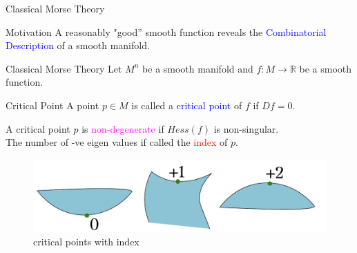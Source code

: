 \documentclass[10pt,sans-serif]{beamer}
\begin{document}
\begin{frame}{Classical Morse Theory}
  \begin{block}{Motivation}
    A reasonably "good'' smooth function reveals the
    \textcolor{blue}{Combinatorial Description} of a smooth manifold.
  \end{block}
\end{frame}


\begin{frame}{Classical Morse Theory}
  Let $M^n$ be a smooth manifold and $f:M\to\mathbb R$ be a smooth function. 
  
  \begin{block}{Critical Point}
    A point $p\in M$ is called a \textcolor{blue}{critical point} of $f$ if
    $Df=0$.
    
    \pause
    \vspace{10pt}
    
    A critical point $p$ is \textcolor{magenta}{non-degenerate} if $Hess(f)$ is
    non-singular. \\
    The number of -ve eigen values if called the \textcolor{red}{index} of $p$.
  \end{block}
  
  
  \pause
  
  \begin{figure}
    \centering
    \includegraphics[scale=0.5]{critical}
    \caption{critical points with index}
  \end{figure}

\end{frame}
\end{document}
